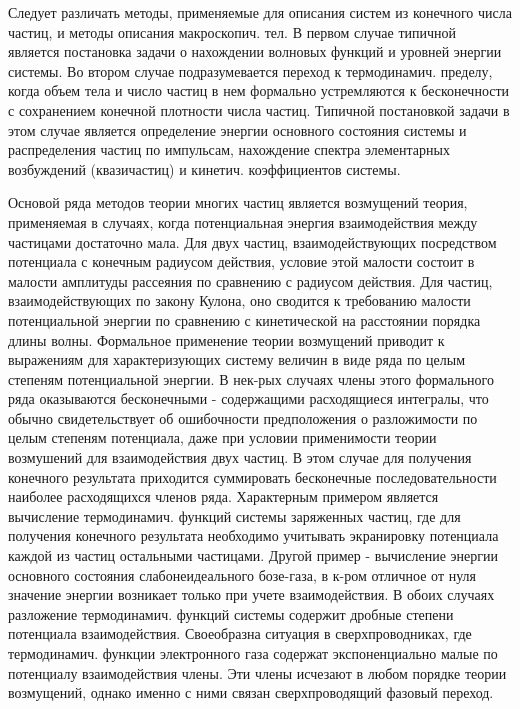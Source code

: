 \documentclass[10pt]{article}
\begin{document}
Следует различать методы, применяемые для описания систем из конечного числа частиц, и методы описания макроскопич. тел. В первом случае типичной является постановка задачи о нахождении волновых функций и уровней энергии системы. Во втором случае подразумевается переход к термодинамич. пределу, когда объем тела и число частиц в нем формально устремляются к бесконечности с сохранением конечной плотности числа частиц. Типичной постановкой задачи в этом случае является определение энергии основного состояния системы и распределения частиц по импульсам, нахождение спектра элементарных возбуждений (квазичастиц) и кинетич. коэффициентов системы.



Основой ряда методов теории многих частиц является возмущений теория, применяемая в случаях, когда потенциальная энергия взаимодействия между частицами достаточно мала. Для двух частиц, взаимодействующих посредством потенциала с конечным радиусом действия, условие этой малости состоит в малости амплитуды рассеяния по сравнению с радиусом действия. Для частиц, взаимодействующих по закону Кулона, оно сводится к требованию малости потенциальной энергии по сравнению с кинетической на расстоянии порядка длины волны. Формальное применение теории возмущений приводит к выражениям для характеризующих систему величин в виде ряда по целым степеням потенциальной энергии. В нек-рых случаях члены этого формального ряда оказываются бесконечными - содержащими расходящиеся интегралы, что обычно свидетельствует об ошибочности предположения о разложимости по целым степеням потенциала, даже при условии применимости теории возмушений для взаимодействия двух частиц. В этом случае для получения конечного результата приходится суммировать бесконечные последовательности наиболее расходящихся членов ряда. Характерным примером является вычисление термодинамич. функций системы заряженных частиц, где для получения конечного результата необходимо учитывать экранировку потенциала каждой из частиц остальными частицами. Другой пример - вычисление энергии основного состояния слабонеидеального бозе-газа, в к-ром отличное от нуля значение энергии возникает только при учете взаимодействия. В обоих случаях разложение термодинамич. функций системы содержит дробные степени потенциала взаимодействия. Своеобразна ситуация в сверхпроводниках, где термодинамич. функции электронного газа содержат экспоненциально малые по потенциалу взаимодействия члены. Эти члены исчезают в любом порядке теории возмущений, однако именно с ними связан сверхпроводящий фазовый переход.
\end{document}
